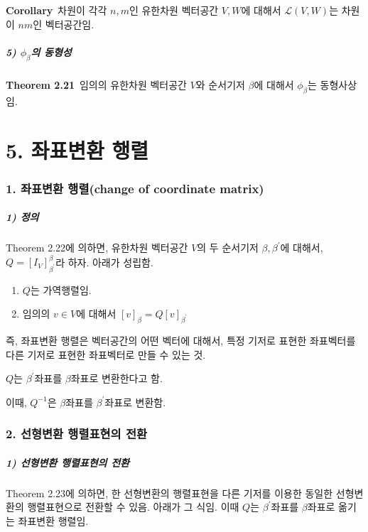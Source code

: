 \textbf{Corollary}\, 차원이 각각 $n,m$인 유한차원 벡터공간 $V,W$에 대해서 $\mathcal{L}(V,W)$는 차원이 $nm$인 벡터공간임.

\subsubsection*{5) $\phi_{\beta}$의 동형성}
\textbf{Theorem 2.21}\, 임의의 유한차원 벡터공간 $V$와 순서기저 $\beta$에 대해서 $\phi_{\beta}$는 동형사상임.


\newpage

\part*{5. 좌표변환 행렬}

\section*{1. 좌표변환 행렬(change of coordinate matrix)}

\subsubsection*{1) 정의\\}
\begin{DEF}
Theorem 2.22에 의하면, 유한차원 벡터공간 $V$의 두 순서기저 $\beta, \beta^{\prime}$에 대해서, $Q=[I_V]^{\beta}_{\beta^{\prime}}$라 하자. 아래가 성립함.

\begin{enumerate}
    \item $Q$는 가역행렬임.
    \item 임의의 $v \in V$에 대해서 $[v]_{\beta}=Q[v]_{\beta^{\prime}}$
\end{enumerate}
\end{DEF}

즉, 좌표변환 행렬은 벡터공간의 어떤 벡터에 대해서, 특정 기저로 표현한 좌표벡터를 다른 기저로 표현한 좌표벡터로 만들 수 있는 것.

$Q$는 $\beta^{\prime}$좌표를 $\beta$좌표로 변환한다고 함.

이때, $Q^{-1}$은 $\beta$좌표를 $\beta^{\prime}$좌표로 변환함.\\


\section*{2. 선형변환 행렬표현의 전환}
\subsubsection*{1) 선형변환 행렬표현의 전환}
Theorem 2.23에 의하면, 한 선형변환의 행렬표현을 다른 기저를 이용한 동일한 선형변환의 행렬표현으로 전환할 수 있음. 아래가 그 식임. 이때 $Q$는 $\beta^{\prime}$좌표를 $\beta$좌표로 옮기는 좌표변환 행렬임.

